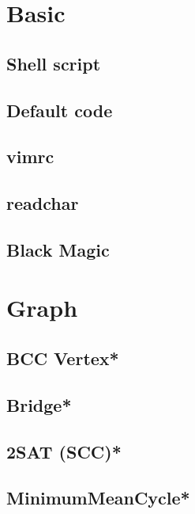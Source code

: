 \section{Basic}
\subsection{Shell script}

\subsection{Default code}

\subsection{vimrc}

\subsection{readchar}

\subsection{Black Magic}

% 


\section{Graph}
\subsection{BCC Vertex*} %

\subsection{Bridge*} %

\subsection{2SAT (SCC)*} %

\subsection{MinimumMeanCycle*} %

